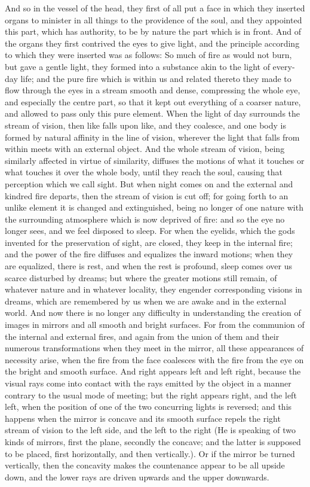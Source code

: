 \documentclass[11pt,letter]{article}
\begin{document}
\par  And so in the vessel of the head, they first of all put a face in which they inserted organs to minister in all things to the providence of the soul, and they appointed this part, which has authority, to be by nature the part which is in front. And of the organs they first contrived the eyes to give light, and the principle according to which they were inserted was as follows: So much of fire as would not burn, but gave a gentle light, they formed into a substance akin to the light of every-day life; and the pure fire which is within us and related thereto they made to flow through the eyes in a stream smooth and dense, compressing the whole eye, and especially the centre part, so that it kept out everything of a coarser nature, and allowed to pass only this pure element. When the light of day surrounds the stream of vision, then like falls upon like, and they coalesce, and one body is formed by natural affinity in the line of vision, wherever the light that falls from within meets with an external object. And the whole stream of vision, being similarly affected in virtue of similarity, diffuses the motions of what it touches or what touches it over the whole body, until they reach the soul, causing that perception which we call sight. But when night comes on and the external and kindred fire departs, then the stream of vision is cut off; for going forth to an unlike element it is changed and extinguished, being no longer of one nature with the surrounding atmosphere which is now deprived of fire: and so the eye no longer sees, and we feel disposed to sleep. For when the eyelids, which the gods invented for the preservation of sight, are closed, they keep in the internal fire; and the power of the fire diffuses and equalizes the inward motions; when they are equalized, there is rest, and when the rest is profound, sleep comes over us scarce disturbed by dreams; but where the greater motions still remain, of whatever nature and in whatever locality, they engender corresponding visions in dreams, which are remembered by us when we are awake and in the external world. And now there is no longer any difficulty in understanding the creation of images in mirrors and all smooth and bright surfaces. For from the communion of the internal and external fires, and again from the union of them and their numerous transformations when they meet in the mirror, all these appearances of necessity arise, when the fire from the face coalesces with the fire from the eye on the bright and smooth surface. And right appears left and left right, because the visual rays come into contact with the rays emitted by the object in a manner contrary to the usual mode of meeting; but the right appears right, and the left left, when the position of one of the two concurring lights is reversed; and this happens when the mirror is concave and its smooth surface repels the right stream of vision to the left side, and the left to the right (He is speaking of two kinds of mirrors, first the plane, secondly the concave; and the latter is supposed to be placed, first horizontally, and then vertically.). Or if the mirror be turned vertically, then the concavity makes the countenance appear to be all upside down, and the lower rays are driven upwards and the upper downwards.
\end{document}
